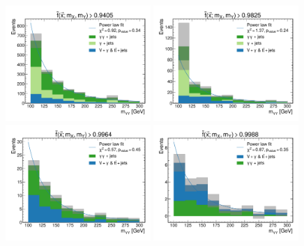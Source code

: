 \begin{figure}
    \centering
    \includegraphics[width=0.49\textwidth]{Figures/Dihiggs/categorisation/mgg_sculpting/y_gg_high_mass/all_bkg/intermediate_transformed_score_NMSSM_XYH_Y_gg_H_tautau_MX_400_MY_200_frac_uncert_0.05.pdf}
    \includegraphics[width=0.49\textwidth]{Figures/Dihiggs/categorisation/mgg_sculpting/y_gg_high_mass/all_bkg/intermediate_transformed_score_NMSSM_XYH_Y_gg_H_tautau_MX_400_MY_200_frac_uncert_0.1.pdf} \\
    \includegraphics[width=0.49\textwidth]{Figures/Dihiggs/categorisation/mgg_sculpting/y_gg_high_mass/exclude_gjet/intermediate_transformed_score_NMSSM_XYH_Y_gg_H_tautau_MX_400_MY_200_frac_uncert_0.05.pdf}
    \includegraphics[width=0.49\textwidth]{Figures/Dihiggs/categorisation/mgg_sculpting/y_gg_high_mass/exclude_gjet/intermediate_transformed_score_NMSSM_XYH_Y_gg_H_tautau_MX_400_MY_200_frac_uncert_0.1.pdf} \\

\end{figure}
